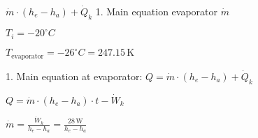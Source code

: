 \( \dot{m} \cdot (h_e - h_a) + \dot{Q}_k \)  
1. Main equation evaporator \( \dot{m} \)  

\( T_i = -20^\circ C \)  

\( T_{\text{evaporator}} = -26^\circ C = 247.15 \, \text{K} \)  

1. Main equation at evaporator:  
\( Q = \dot{m} \cdot (h_e - h_a) + \dot{Q}_k \)  

\( Q = \dot{m} \cdot (h_e - h_a) \cdot t - \dot{W}_k \)  

\( \dot{m} = \frac{\dot{W}_k}{h_e - h_a} = \frac{28 \, \text{W}}{h_e - h_a} \)